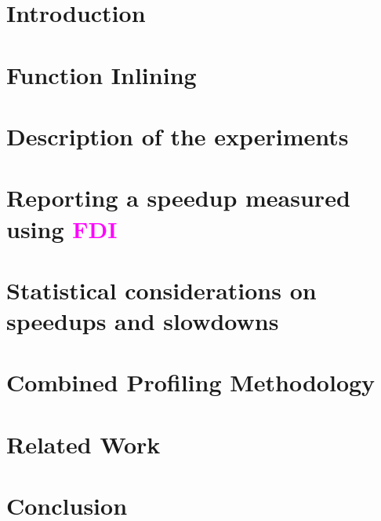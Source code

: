 \documentclass[conference]{IEEEtran}
\renewcommand{\ifColorText}[2]{\textcolor{#1}{#2}}  %
\def\FDI{{\ifColorText{Magenta}{FDI}}}
\begin{document}
\section{Introduction}
	\label{sec:intro}
	

\section{Function Inlining}
	\label{sec:inlining}
	

\section{Description of the experiments}
	\label{sec:description}
	

\section{Reporting a speedup measured using \FDI\ }
	\label{sec:speedup}
	

\section{Statistical considerations on speedups and slowdowns}
	\label{sec:robust}
	

\section{Combined Profiling Methodology}
	\label{sec:cmbprof}
	

\section{Related Work}
	\label{sec:related}
	

\section{Conclusion}
	\label{sec:conclusion}
	

%	

%


\end{document}
